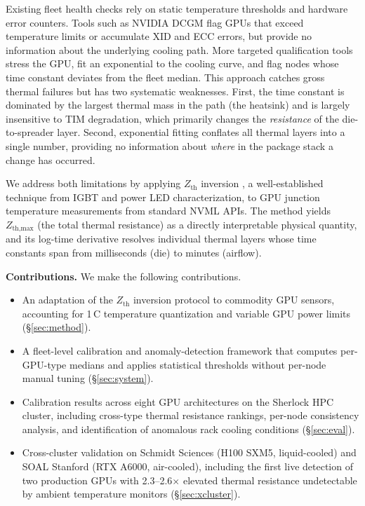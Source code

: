 \documentclass[conference]{IEEEtran}
\begin{document}
Existing fleet health checks rely on static temperature thresholds
and hardware error counters.
Tools such as NVIDIA DCGM flag GPUs that exceed temperature limits
or accumulate XID and ECC errors, but provide no information about
the underlying cooling path.
More targeted qualification tools stress the GPU, fit an exponential
to the cooling curve, and flag nodes whose time constant deviates
from the fleet median.
This approach catches gross thermal failures but has two systematic
weaknesses.
First, the time constant is dominated by the largest thermal mass in
the path (the heatsink) and is largely insensitive to TIM
degradation, which primarily changes the \emph{resistance} of the
die-to-spreader layer.
Second, exponential fitting conflates all thermal layers into a single
number, providing no information about \emph{where} in the package
stack a change has occurred.

We address both limitations by applying $Z_\text{th}$ inversion
\cite{szekely1988,szekely2002,jedec2010}, a well-established technique from
IGBT and power LED characterization, to GPU junction temperature
measurements from standard NVML APIs.
The method yields $Z_\text{th,max}$ (the total thermal resistance)
as a directly interpretable physical quantity, and its
log-time derivative resolves individual thermal layers whose time
constants span from milliseconds (die) to minutes (airflow).

\medskip\noindent\textbf{Contributions.} We make the following
contributions.
\begin{itemize}
  \item An adaptation of the $Z_\text{th}$ inversion protocol to
    commodity GPU sensors, accounting for 1\,\textdegree C
    temperature quantization and variable GPU power limits
    (\S\ref{sec:method}).
  \item A fleet-level calibration and anomaly-detection framework
    that computes per-GPU-type medians and applies statistical
    thresholds without per-node manual tuning
    (\S\ref{sec:system}).
  \item Calibration results across eight GPU architectures on the
    Sherlock HPC cluster, including cross-type thermal resistance
    rankings, per-node consistency analysis, and identification of
    anomalous rack cooling conditions
    (\S\ref{sec:eval}).
  \item Cross-cluster validation on Schmidt Sciences (H100 SXM5,
    liquid-cooled) and SOAL Stanford (RTX A6000, air-cooled),
    including the first live detection of two production GPUs with
    2.3--2.6$\times$ elevated thermal resistance undetectable by
    ambient temperature monitors (\S\ref{sec:xcluster}).
\end{itemize}
\end{document}
